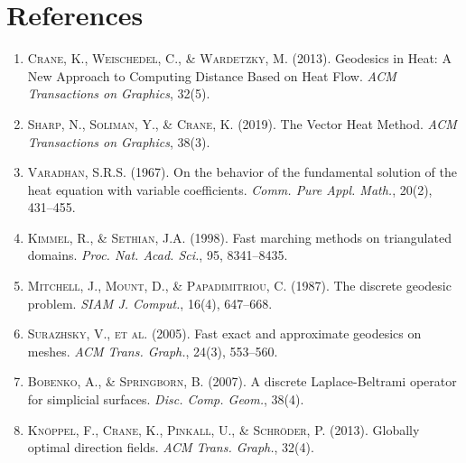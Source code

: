 \documentclass[11pt,a4paper]{article}
\begin{document}
\section{References}
\begin{enumerate}[nosep]
    \item \textsc{Crane, K., Weischedel, C., \& Wardetzky, M.} (2013). Geodesics in Heat: A New Approach to Computing Distance Based on Heat Flow. \textit{ACM Transactions on Graphics}, 32(5).
    \item \textsc{Sharp, N., Soliman, Y., \& Crane, K.} (2019). The Vector Heat Method. \textit{ACM Transactions on Graphics}, 38(3).
    \item \textsc{Varadhan, S.R.S.} (1967). On the behavior of the fundamental solution of the heat equation with variable coefficients. \textit{Comm. Pure Appl. Math.}, 20(2), 431--455.
    \item \textsc{Kimmel, R., \& Sethian, J.A.} (1998). Fast marching methods on triangulated domains. \textit{Proc. Nat. Acad. Sci.}, 95, 8341--8435.
    \item \textsc{Mitchell, J., Mount, D., \& Papadimitriou, C.} (1987). The discrete geodesic problem. \textit{SIAM J. Comput.}, 16(4), 647--668.
    \item \textsc{Surazhsky, V., et al.} (2005). Fast exact and approximate geodesics on meshes. \textit{ACM Trans. Graph.}, 24(3), 553--560.
    \item \textsc{Bobenko, A., \& Springborn, B.} (2007). A discrete Laplace-Beltrami operator for simplicial surfaces. \textit{Disc. Comp. Geom.}, 38(4).
    \item \textsc{Knöppel, F., Crane, K., Pinkall, U., \& Schröder, P.} (2013). Globally optimal direction fields. \textit{ACM Trans. Graph.}, 32(4).
\end{enumerate}
\end{document}
